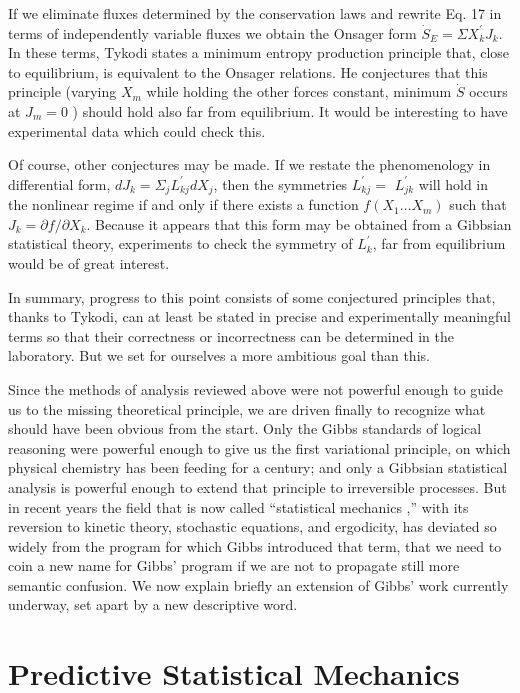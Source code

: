 \documentclass{article}
\begin{document}
If we eliminate fluxes determined by the conservation laws and rewrite Eq. 17 in terms of independently variable fluxes we obtain the Onsager form $\dot{S}_E=\Sigma X_k^{\prime} J_k$. In these terms, Tykodi states a minimum entropy production principle that, close to equilibrium, is equivalent to the Onsager relations. He conjectures that this principle (varying $X_m$ while holding the other forces constant, minimum $\dot{S}$ occurs at $J_m=0$ ) should hold also far from equilibrium. It would be interesting to have experimental data which could check this.

Of course, other conjectures may be made. If we restate the phenomenology in differential form, $d J_k=\Sigma_j L_{k j}^{\prime} d X_j$, then the symmetries $L_{k j}^{\prime}=$ $L_{j k}^{\prime}$ will hold in the nonlinear regime if and only if there exists a function $f\left(X_1 \ldots X_m\right)$ such that $J_k=\partial f / \partial X_k$. Because it appears that this form may be obtained from a Gibbsian statistical theory, experiments to check the symmetry of $L_k^{\prime}$, far from equilibrium would be of great interest.

In summary, progress to this point consists of some conjectured principles that, thanks to Tykodi, can at least be stated in precise and experimentally meaningful terms so that their correctness or incorrectness can be determined in the laboratory. But we set for ourselves a more ambitious goal than this.

Since the methods of analysis reviewed above were not powerful enough to guide us to the missing theoretical principle, we are driven finally to recognize what should have been obvious from the start. Only the Gibbs standards of logical reasoning were powerful enough to give us the first variational principle, on which physical chemistry has been feeding for a century; and only a Gibbsian statistical analysis is powerful enough to extend that principle to irreversible processes. But in recent years the field that is now called ``statistical mechanics ,'' with its reversion to kinetic theory, stochastic equations, and ergodicity, has deviated so widely from the program for which Gibbs introduced that term, that we need to coin a new name for Gibbs' program if we are not to propagate still more semantic confusion. We now explain briefly an extension of Gibbs' work currently underway, set apart by a new descriptive word.

\section{Predictive Statistical Mechanics}
\end{document}
